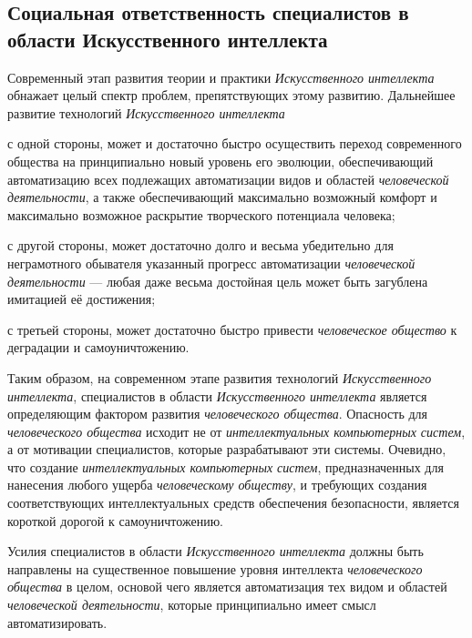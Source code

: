 \subsection*{Социальная ответственность специалистов в области Искусственного интеллекта}
Современный этап развития теории и практики \textit{Искусственного интеллекта} обнажает целый спектр проблем, препятствующих этому развитию. Дальнейшее развитие технологий \textit{Искусственного интеллекта}
\begin{textitemize}
	\item с одной стороны, может и достаточно быстро осуществить переход современного общества на принципиально новый уровень его эволюции, обеспечивающий  автоматизацию всех подлежащих автоматизации видов и областей \textit{человеческой деятельности}, а также обеспечивающий максимально возможный комфорт и максимально возможное раскрытие творческого потенциала  человека;
	\item с другой стороны, может достаточно долго и весьма убедительно для неграмотного обывателя  указанный прогресс автоматизации \textit{человеческой деятельности} --- любая даже весьма достойная цель может быть загублена имитацией её достижения;
	\item с третьей стороны, может достаточно быстро привести \textit{человеческое общество} к деградации и самоуничтожению.
\end{textitemize}

Таким образом, на современном этапе развития технологий \textit{Искусственного интеллекта},   специалистов в области \textit{Искусственного интеллекта} является определяющим фактором развития \textit{человеческого общества}. Опасность для \textit{человеческого общества} исходит не от \textit{интеллектуальных компьютерных систем}, а от мотивации специалистов, которые разрабатывают эти системы. Очевидно, что создание \textit{интеллектуальных компьютерных систем}, предназначенных для  нанесения любого ущерба \textit{человеческому обществу}, и требующих создания соответствующих интеллектуальных средств обеспечения безопасности, является короткой дорогой к самоуничтожению.

Усилия специалистов в области \textit{Искусственного интеллекта} должны быть направлены на существенное повышение уровня интеллекта \textit{человеческого общества} в целом, основой чего является  автоматизация  тех видом и областей \textit{человеческой деятельности}, которые принципиально имеет смысл автоматизировать.

